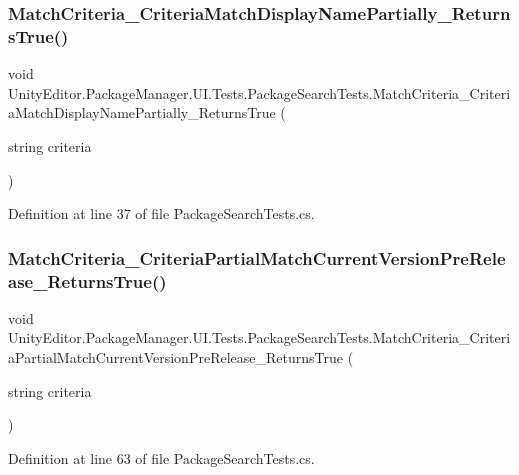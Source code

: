 \subsubsection{\texorpdfstring{MatchCriteria\_CriteriaMatchDisplayNamePartially\_ReturnsTrue()}{MatchCriteria\_CriteriaMatchDisplayNamePartially\_ReturnsTrue()}}
{\footnotesize\ttfamily void Unity\+Editor.\+Package\+Manager.\+U\+I.\+Tests.\+Package\+Search\+Tests.\+Match\+Criteria\+\_\+\+Criteria\+Match\+Display\+Name\+Partially\+\_\+\+Returns\+True (\begin{DoxyParamCaption}\item[{string}]{criteria }\end{DoxyParamCaption})}



Definition at line 37 of file Package\+Search\+Tests.\+cs.

\mbox{\label{class_unity_editor_1_1_package_manager_1_1_u_i_1_1_tests_1_1_package_search_tests_ad7764ccdca43f1c514b61de7e4bf494a}} 
\subsubsection{\texorpdfstring{MatchCriteria\_CriteriaPartialMatchCurrentVersionPreRelease\_ReturnsTrue()}{MatchCriteria\_CriteriaPartialMatchCurrentVersionPreRelease\_ReturnsTrue()}}
{\footnotesize\ttfamily void Unity\+Editor.\+Package\+Manager.\+U\+I.\+Tests.\+Package\+Search\+Tests.\+Match\+Criteria\+\_\+\+Criteria\+Partial\+Match\+Current\+Version\+Pre\+Release\+\_\+\+Returns\+True (\begin{DoxyParamCaption}\item[{string}]{criteria }\end{DoxyParamCaption})}



Definition at line 63 of file Package\+Search\+Tests.\+cs.

